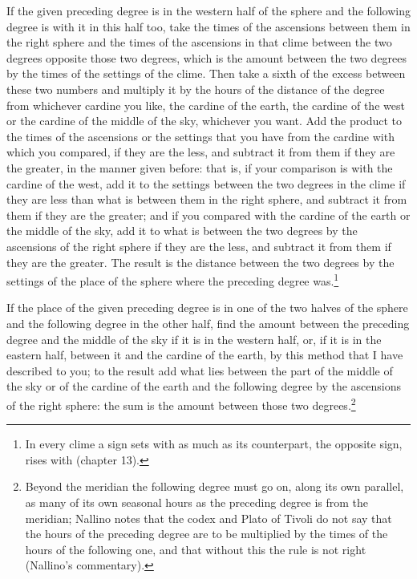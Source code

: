 \documentclass[11pt]{article}
\newcommand{\ArPage}[1]{\marginpar{\footnotesize\color{gray}Ar.\,p.\,#1}}
\begin{document}
\par \ArPage{202}If the given preceding degree is in the western half of the sphere and the following degree is with it in this half too, take the times of the ascensions between them in the right sphere and the times of the ascensions in that clime between the two degrees opposite those two degrees, which is the amount between the two degrees by the times of the settings of the clime. Then take a sixth of the excess between these two numbers and multiply it by the hours of the distance of the degree from whichever cardine you like, the cardine of the earth, the cardine of the west or the cardine of the middle of the sky, whichever you want. Add the product to the times of the ascensions or the settings that you have from the cardine with which you compared, if they are the less, and subtract it from them if they are the greater, in the manner given before: that is, if your comparison is with the cardine of the west, add it to the settings between the two degrees in the clime if they are less than what is between them in the right sphere, and subtract it from them if they are the greater; and if you compared with the cardine of the earth or the middle of the sky, add it to what is between the two degrees by the ascensions of the right sphere if they are the less, and subtract it from them if they are the greater. The result is the distance between the two degrees by the settings of the place of the sphere where the preceding degree was.\footnote{In every clime a sign sets with as much as its counterpart, the opposite sign, rises with (chapter 13).}\par
\par If the place of the given preceding degree is in one of the two halves of the sphere and the following degree in the other half, find the amount between the preceding degree and the middle of the sky if it is in the western half, or, if it is in the eastern half, between it and the cardine of the earth, by this method that I have described to you; to the result add what lies between the part of the middle of the sky or of the cardine of the earth and the following degree by the ascensions of the right sphere: the sum is the amount between those two degrees.\footnote{Beyond the meridian the following degree must go on, along its own parallel, as many of its own seasonal hours as the preceding degree is from the meridian; Nallino notes that the codex and Plato of Tivoli do not say that the hours of the preceding degree are to be multiplied by the times of the hours of the following one, and that without this the rule is not right (Nallino's commentary).}\par
\end{document}
